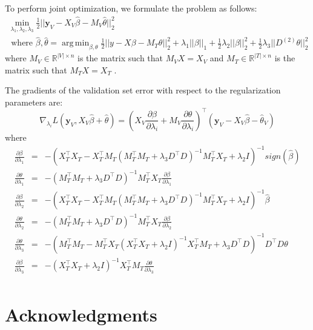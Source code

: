 \documentclass[10pt,letterpaper]{article}
\DeclareMathOperator*{\argmin}{arg\,min}
\begin{document}
To perform joint optimization, we formulate the problem as follows:
\begin{multline}
\min_{\lambda_1, \lambda_2, \lambda_3} \frac{1}{2} \bigl\lvert\bigl\lvert \boldsymbol y_V - X_V\hat\beta - M_V \hat\theta \bigl\rvert\bigl\rvert^2_2 \\
\text{ where } \hat\beta, \hat\theta = \argmin_{\beta, \theta} \frac{1}{2} \bigl\lvert\bigl\lvert y - X\beta - M_T \theta \bigl\rvert\bigl\rvert^2_2
+ \lambda_1 \lvert\lvert \beta \rvert \rvert_1
+ \frac{1}{2} \lambda_2 \lvert\lvert \beta \rvert \rvert_2^2
+ \frac{1}{2} \lambda_3 \lvert\lvert D^{(2)} \theta \rvert \rvert_2^2
\end{multline}
where $M_V \in \mathbb{R}^{|V| \times n}$ is the matrix such that $M_V X = X_V$ and $M_T \in \mathbb{R}^{|T| \times n}$ is the matrix such that $M_T X = X_T$ .

The gradients of the validation set error with respect to the regularization parameters are:
\begin{equation}
\nabla_{\lambda_i} L(\boldsymbol y_V, X_V \hat \beta + \hat \theta) = (X_V \frac{\partial \beta}{\partial \lambda_i} + M_V \frac{\partial \theta}{\partial \lambda_i})^\top(\boldsymbol y_V - X_V \hat \beta - \hat \theta_V)
\end{equation}
where
\begin{equation}
\begin{array}{lcl}
\frac{\partial \beta}{\partial \lambda_1} &=& -(X_T^\top X_T - X_T^\top M_T(M_T^\top M_T + \lambda_3 D^\top D)^{-1} M_T^\top X_T + \lambda_2 I)^{-1} sign(\hat \beta) \\
\frac{\partial \theta}{\partial \lambda_1} &=& -(M_T^\top M_T + \lambda_3 D^\top D)^{-1}  M_T^\top X_T \frac{\partial \beta}{\partial \lambda_1}
\\
\frac{\partial \beta}{\partial \lambda_2} &=& -(X_T^\top X_T - X_T^\top M_T(M_T^\top M_T + \lambda_3 D^\top D)^{-1} M_T^\top X_T + \lambda_2 I)^{-1} \hat \beta \\
\frac{\partial \theta}{\partial \lambda_2} &=& -(M_T^\top M_T + \lambda_3 D^\top D)^{-1}  M_T^\top X_T \frac{\partial \beta}{\partial \lambda_2}
\\
\frac{\partial \theta}{\partial \lambda_3} &=& -(M_T^\top M_T - M_T^\top X_T (X_T^\top X_T + \lambda_2 I)^{-1} X_T^\top M_T + \lambda_3 D^\top D)^{-1} D^\top D \theta
\\
\frac{\partial \beta}{\partial \lambda_3} &=& - (X_T^\top X_T + \lambda_2 I)^{-1} X_T^\top M_T \frac{\partial \theta}{\partial \lambda_3} \\
\end{array}
\end{equation}

\section*{Acknowledgments}




\end{document}
